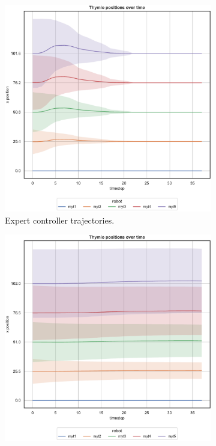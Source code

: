 \begin{figure}[!htb]
	\begin{center}
		\begin{subfigure}[h]{0.49\textwidth}
			\centering
			\includegraphics[width=.9\textwidth]{contents/images/net-d12/position-overtime-omniscient}%
			\caption{Expert controller trajectories.}
		\end{subfigure}
		\hfill
		\begin{subfigure}[h]{0.49\textwidth}
			\centering
			\includegraphics[width=.9\textwidth]{contents/images/net-d12/position-overtime-learned_distributed}

\end{subfigure}
\end{center}
\end{figure}
